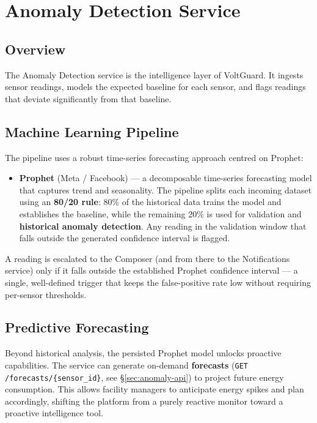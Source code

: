 \documentclass[12pt,a4paper,oneside]{report}
\begin{document}
\chapter{Anomaly Detection Service}
\label{ch:anomaly}

\section{Overview}

The Anomaly Detection service is the intelligence layer of VoltGuard. It ingests sensor readings, models the expected baseline for each sensor, and flags readings that deviate significantly from that baseline.

\section{Machine Learning Pipeline}

The pipeline uses a robust time-series forecasting approach centred on Prophet:

\begin{itemize}
  \item \textbf{Prophet} (Meta / Facebook) — a decomposable time-series forecasting model that captures trend and seasonality. The pipeline splits each incoming dataset using an \textbf{80/20 rule}: 80\% of the historical data trains the model and establishes the baseline, while the remaining 20\% is used for validation and \textbf{historical anomaly detection}. Any reading in the validation window that falls outside the generated confidence interval is flagged.
\end{itemize}

A reading is escalated to the Composer (and from there to the Notifications service) only if it falls outside the established Prophet confidence interval — a single, well-defined trigger that keeps the false-positive rate low without requiring per-sensor thresholds.

\section{Predictive Forecasting}

Beyond historical analysis, the persisted Prophet model unlocks proactive capabilities. The service can generate on-demand \textbf{forecasts} (\texttt{GET /forecasts/\{sensor\_id\}}, see §\ref{sec:anomaly-api}) to project future energy consumption. This allows facility managers to anticipate energy spikes and plan accordingly, shifting the platform from a purely reactive monitor toward a proactive intelligence tool.
\end{document}
